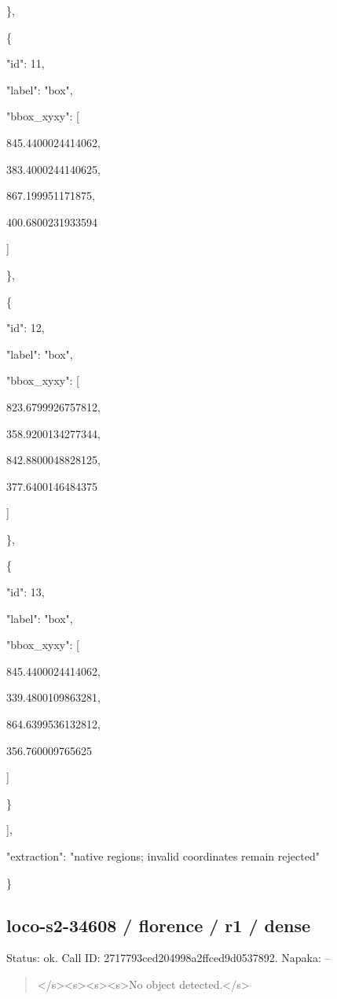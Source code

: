 \documentclass[10pt,a4paper]{article}
\begin{document}
    \},\allowbreak{}\par
    \{\par
      "id":\allowbreak{} 11,\allowbreak{}\par
      "label":\allowbreak{} "box",\allowbreak{}\par
      "bbox\_xyxy":\allowbreak{} [\par
        845.4400024414062,\allowbreak{}\par
        383.4000244140625,\allowbreak{}\par
        867.199951171875,\allowbreak{}\par
        400.6800231933594\par
      ]\par
    \},\allowbreak{}\par
    \{\par
      "id":\allowbreak{} 12,\allowbreak{}\par
      "label":\allowbreak{} "box",\allowbreak{}\par
      "bbox\_xyxy":\allowbreak{} [\par
        823.6799926757812,\allowbreak{}\par
        358.9200134277344,\allowbreak{}\par
        842.8800048828125,\allowbreak{}\par
        377.6400146484375\par
      ]\par
    \},\allowbreak{}\par
    \{\par
      "id":\allowbreak{} 13,\allowbreak{}\par
      "label":\allowbreak{} "box",\allowbreak{}\par
      "bbox\_xyxy":\allowbreak{} [\par
        845.4400024414062,\allowbreak{}\par
        339.4800109863281,\allowbreak{}\par
        864.6399536132812,\allowbreak{}\par
        356.760009765625\par
      ]\par
    \}\par
  ],\allowbreak{}\par
  "extraction":\allowbreak{} "native regions; invalid coordinates remain rejected"\par
\}
\subsection*{loco-s2-34608 / florence / r1 / dense}
Status: ok. Call ID: 2717793ced204998a2ffced9d0537892. Napaka: --
\begin{quote}\footnotesize
</s>\allowbreak{}<s>\allowbreak{}<s>\allowbreak{}<s>\allowbreak{}No object detected.</s>\allowbreak{}
\end{quote}
\end{document}
